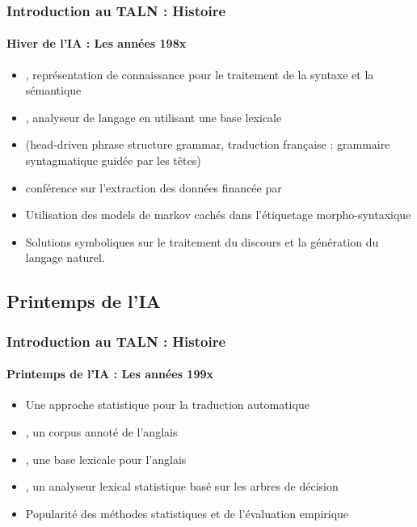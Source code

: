\documentclass{beamer}
\begin{document}
\begin{frame}
\frametitle{Introduction au TALN : Histoire}
\framesubtitle{Hiver de l'IA : Les années 198x}

\begin{itemize}
	\item {} , représentation de connaissance pour le traitement de la syntaxe et la sémantique \cite{1980-bobrow}
	\item {} , analyseur de langage en utilisant une base lexicale \cite{1986-jacobs}
	\item {}  (head-driven phrase structure grammar, traduction française : grammaire syntagmatique guidée par les têtes) \cite{1987-sag-pollard}
	\item {}  conférence sur l'extraction des données financée par 
	\item {} Utilisation des models de markov cachés dans  l'étiquetage morpho-syntaxique \cite{1988-church}
	\item Solutions symboliques sur le traitement du discours et la génération du langage naturel.
\end{itemize}

\end{frame}

\subsection{Printemps de l'IA}

\begin{frame}
\frametitle{Introduction au TALN : Histoire}
\framesubtitle{Printemps de l'IA : Les années 199x}

\begin{itemize}
	\item {} Une approche statistique pour la traduction automatique \cite{1990-brown-al}
	\item {} , un corpus annoté de l'anglais \cite{1993-marcus-al}
	\item {} , une base lexicale pour l'anglais \cite{1995-miller}
	\item {} , un analyseur lexical statistique basé sur les arbres de décision \cite{1996-magerman}
	\item Popularité des méthodes statistiques et de l'évaluation empirique
\end{itemize}

\end{frame}
\end{document}
